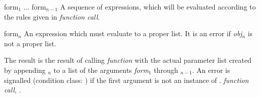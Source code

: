 \begin{optDefinition}
\begin{arguments}
    \item[form$_1$ ... form$_{n-1}$] A sequence of expressions, which will be
    evaluated according to the rules given in {\em function call}.

    \item[form$_n$] An expression which must evaluate to a proper list.  It is
    an error if {\em obj$_n$} is not a proper list.
\end{arguments}
%
\result%
The result is the result of calling {\em function} with the actual parameter
list created by appending \form$_n$ to a list of the arguments {\em
    form}$_1$ through \form$_{n-1}$.  An error is signalled (condition
class: ) if the
first argument is not an instance of .
%
\seealso%
{\em function call}, .
\end{optDefinition}


